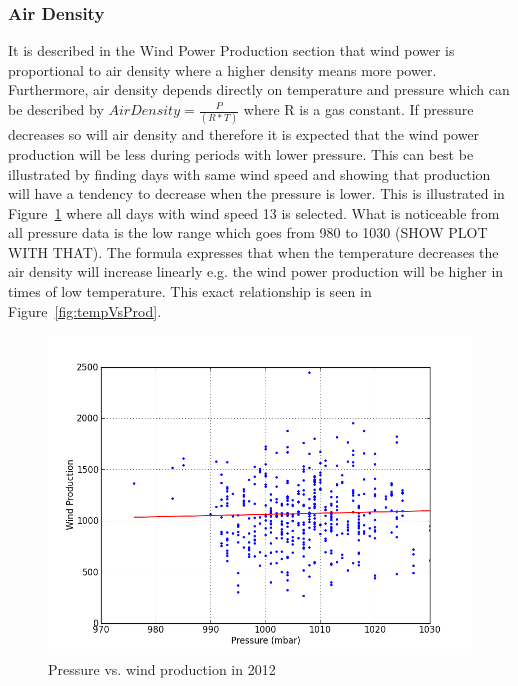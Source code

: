 \subsubsection{Air Density}
It is described in the Wind Power Production section that wind power is proportional to air density where a higher density means more power. Furthermore, air density depends directly on temperature and pressure which can be described by $Air Density=\frac{P}{(R*T)}$ where R is a gas constant. If pressure decreases so will air density and therefore it is expected that the wind power production will be less during periods with lower pressure. This can best be illustrated by finding days with same wind speed and showing that production will have a tendency to decrease when the pressure is lower. This is illustrated in Figure~\ref{fig:pressureVsProd} where all days with wind speed 13 is selected. What is noticeable from all pressure data is the low range which goes from 980 to 1030 (SHOW PLOT WITH THAT).
The formula expresses that when the temperature decreases the air density will increase linearly e.g. the wind power production will be higher in times of low temperature. This exact relationship is seen in Figure~\ref{fig:tempVsProd}.
\begin{figure}[h!]
\centering
\includegraphics[width=0.99\linewidth,natwidth=898,natheight=587]{billeder/windProductionForPressure13.png}
\caption{Pressure vs. wind production in 2012}
\label{fig:pressureVsProd}
\end{figure}

